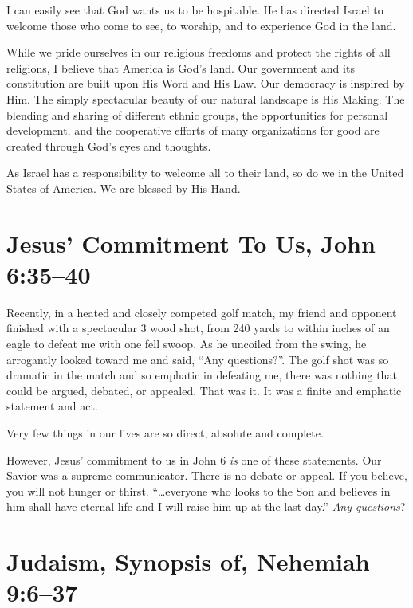 \documentclass[12pt]{memoir}
\begin{document}
I can easily see that God wants us to be hospitable. He has directed Israel to welcome those who come to see, to worship, and to experience God in the land.

While we pride ourselves in our religious freedoms and protect the rights of all religions, I believe that
America is God's land. Our government and its constitution are built upon His Word and His Law. Our democracy is inspired by Him. The simply spectacular beauty of our natural landscape is His Making. The blending and sharing of different ethnic groups, the opportunities for personal development, and the cooperative efforts of many organizations
for good are created through God's eyes and thoughts.

As Israel has a responsibility to welcome all to their land, so do we in the United States of America. We are blessed by His Hand. 


\section[Jesus' Commitment To Us]{Jesus' Commitment To Us, John 6:35--40}

Recently, in a heated and closely competed golf match, my friend and
opponent finished with a spectacular 3 wood shot, from 240 yards to
within inches of an eagle to defeat me with one fell swoop. As he
uncoiled from the swing, he arrogantly looked toward me and said,
``Any questions?''. The golf shot was so dramatic in the match and so emphatic in defeating me, there was nothing that could be argued, debated, or appealed. That was it. It was a finite and emphatic statement and act.

Very few things in our lives are so direct, absolute and complete.

However, Jesus' commitment to us in John 6 \emph{is} one of these statements. Our Savior was a supreme communicator. There is no debate or appeal. If
you believe, you will not hunger or thirst. ``\dots  everyone who
looks to the Son and believes in him shall have eternal life and I will raise him up at the last day.'' \emph{Any questions}?


\section[Judaism, Synopsis of]{Judaism, Synopsis of, Nehemiah 9:6--37}
\end{document}
